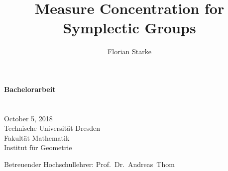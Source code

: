 \title{Measure Concentration for\\Symplectic Groups}
\author{Florian Starke}

	\begin{titlepage}
		\vspace*{\bigskipamount}
		\begin{center}
			\makeatletter
			\noindent
			\LARGE \textbf{Bachelorarbeit}                 \\[ 4   ex]
			\huge  \textbf{\@title}                     \\[10   ex]
			\Large \textbf{\@author}                    \\[ 1 ex]
			\Large October 5, 2018                     \\[ 6   ex]
			\LARGE Technische Universität Dresden        \\
			\Large Fakultät Mathematik                   \\
			       Institut für Geometrie  
			\makeatother
		\end{center}
		\vfill
		\begin{flushleft}
			\noindent
			\Large
			Betreuender Hochschullehrer: Prof.\ Dr.\ Andreas~Thom   \\
		\end{flushleft}
	\end{titlepage}
	\thispagestyle{empty}\mbox{}
	\clearpage
